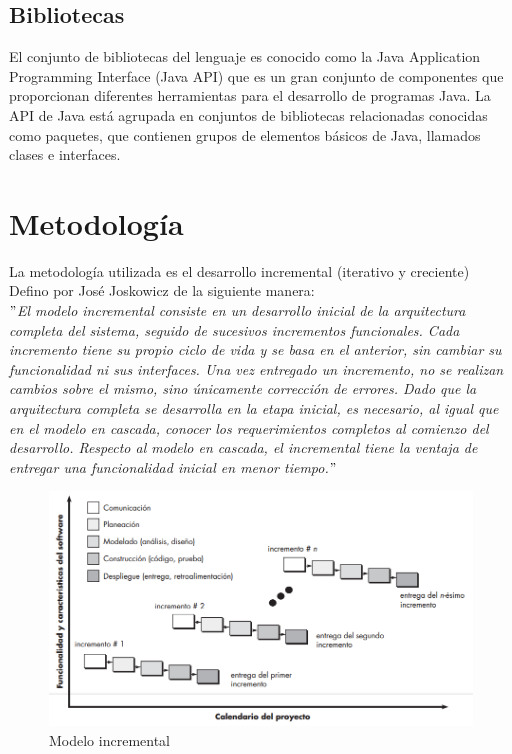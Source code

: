 \subsection{Bibliotecas}

El conjunto de bibliotecas del lenguaje es conocido como la Java Application Programming Interface (Java API) que es un gran conjunto de componentes que proporcionan diferentes herramientas para el desarrollo de programas Java. La API de Java está agrupada en conjuntos de bibliotecas relacionadas conocidas como paquetes, que contienen grupos de elementos básicos de Java, llamados clases e interfaces. \cite[pág. 6]{nunez2003investigacion}


\section{Metodología}   

La metodología utilizada es el desarrollo incremental (iterativo y creciente)
\\
Defino por José Joskowicz de la siguiente manera:
\\
\textit{$"$El modelo incremental consiste en un desarrollo inicial de la arquitectura completa del sistema, seguido de sucesivos incrementos funcionales. Cada incremento tiene su propio ciclo de vida y se basa en el anterior, sin cambiar su funcionalidad ni sus interfaces. Una vez entregado un incremento, no se realizan cambios sobre el mismo, sino únicamente corrección de errores. Dado que la arquitectura completa se desarrolla en la etapa inicial, es necesario, al igual que en el modelo en cascada, conocer los requerimientos completos al comienzo del desarrollo. 
Respecto al modelo en cascada, el incremental tiene la ventaja de entregar una funcionalidad inicial en menor tiempo.$"$} \cite[pág. 6 - 7]{joskowicz2008reglas}\\



\begin{figure}[hbtp]
\centering
\includegraphics[scale=0.4]{fig/incremental.png}
\caption{\label{metodologia} Modelo incremental}
\end{figure}

